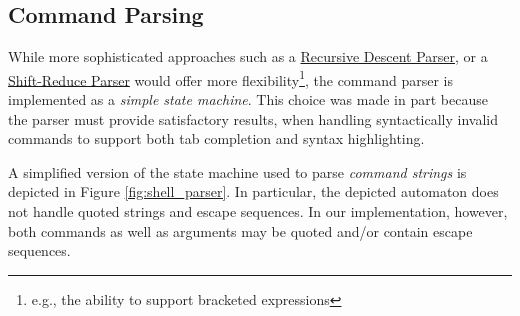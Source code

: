 \subsection{Command Parsing} \label{sec:shell_cmd_parsing}

While more sophisticated approaches such as a \href{https://en.wikipedia.org/wiki/Recursive_descent_parser}{Recursive Descent Parser}, or a \href{https://en.wikipedia.org/wiki/Shift-reduce_parser}{Shift-Reduce Parser} would offer more flexibility\footnote{e.g., the ability to support bracketed expressions}, the command parser is implemented as a \emph{simple state machine}. This choice was made in part because the parser must provide satisfactory results, when handling syntactically invalid commands to support both tab completion and syntax highlighting.


A simplified version of the state machine used to parse \emph{command strings} is depicted in Figure \ref{fig:shell_parser}. In particular, the depicted automaton does not handle quoted strings and escape sequences. In our implementation, however, both commands as well as arguments may be quoted and/or contain escape sequences.





